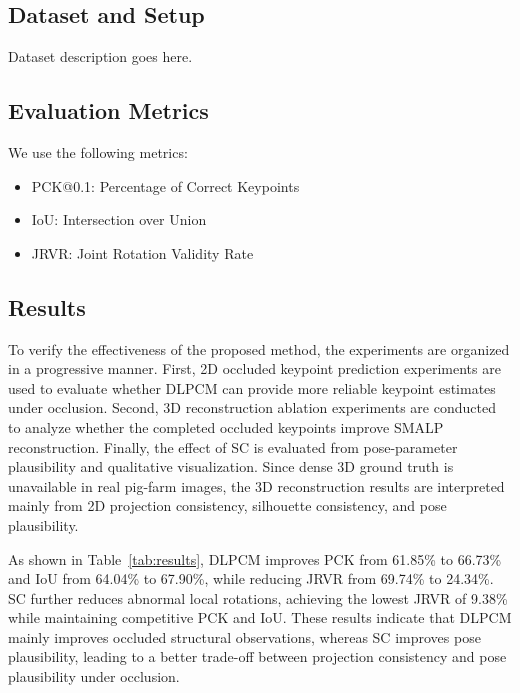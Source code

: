 \documentclass[runningheads]{llncs}
\begin{document}
\subsection{Dataset and Setup}
\label{subsec:dataset}

Dataset description goes here.

\subsection{Evaluation Metrics}
\label{subsec:metrics}

We use the following metrics:
\begin{itemize}
\item PCK@0.1: Percentage of Correct Keypoints
\item IoU: Intersection over Union
\item JRVR: Joint Rotation Validity Rate
\end{itemize}

\subsection{Results}
\label{subsec:results}

To verify the effectiveness of the proposed method, the experiments are organized in a progressive manner. First, 2D occluded keypoint prediction experiments are used to evaluate whether DLPCM can provide more reliable keypoint estimates under occlusion. Second, 3D reconstruction ablation experiments are conducted to analyze whether the completed occluded keypoints improve SMALP reconstruction. Finally, the effect of SC is evaluated from pose-parameter plausibility and qualitative visualization. Since dense 3D ground truth is unavailable in real pig-farm images, the 3D reconstruction results are interpreted mainly from 2D projection consistency, silhouette consistency, and pose plausibility.

As shown in Table~\ref{tab:results}, DLPCM improves PCK from 61.85\% to 66.73\% and IoU from 64.04\% to 67.90\%, while reducing JRVR from 69.74\% to 24.34\%. SC further reduces abnormal local rotations, achieving the lowest JRVR of 9.38\% while maintaining competitive PCK and IoU. These results indicate that DLPCM mainly improves occluded structural observations, whereas SC improves pose plausibility, leading to a better trade-off between projection consistency and pose plausibility under occlusion.
\end{document}
